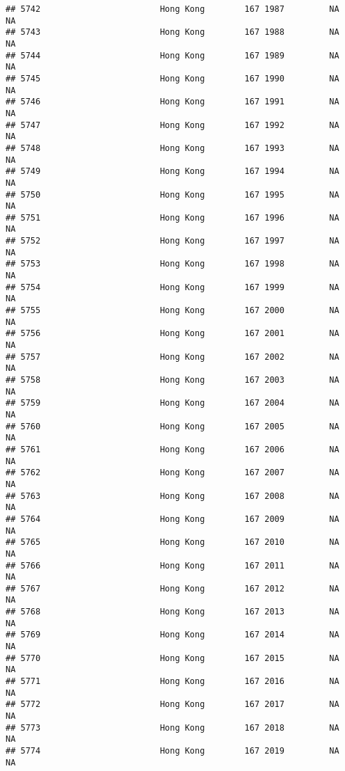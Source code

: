 \documentclass[
]{article}
\begin{document}
\begin{verbatim}
## 5742                        Hong Kong        167 1987         NA         NA
## 5743                        Hong Kong        167 1988         NA         NA
## 5744                        Hong Kong        167 1989         NA         NA
## 5745                        Hong Kong        167 1990         NA         NA
## 5746                        Hong Kong        167 1991         NA         NA
## 5747                        Hong Kong        167 1992         NA         NA
## 5748                        Hong Kong        167 1993         NA         NA
## 5749                        Hong Kong        167 1994         NA         NA
## 5750                        Hong Kong        167 1995         NA         NA
## 5751                        Hong Kong        167 1996         NA         NA
## 5752                        Hong Kong        167 1997         NA         NA
## 5753                        Hong Kong        167 1998         NA         NA
## 5754                        Hong Kong        167 1999         NA         NA
## 5755                        Hong Kong        167 2000         NA         NA
## 5756                        Hong Kong        167 2001         NA         NA
## 5757                        Hong Kong        167 2002         NA         NA
## 5758                        Hong Kong        167 2003         NA         NA
## 5759                        Hong Kong        167 2004         NA         NA
## 5760                        Hong Kong        167 2005         NA         NA
## 5761                        Hong Kong        167 2006         NA         NA
## 5762                        Hong Kong        167 2007         NA         NA
## 5763                        Hong Kong        167 2008         NA         NA
## 5764                        Hong Kong        167 2009         NA         NA
## 5765                        Hong Kong        167 2010         NA         NA
## 5766                        Hong Kong        167 2011         NA         NA
## 5767                        Hong Kong        167 2012         NA         NA
## 5768                        Hong Kong        167 2013         NA         NA
## 5769                        Hong Kong        167 2014         NA         NA
## 5770                        Hong Kong        167 2015         NA         NA
## 5771                        Hong Kong        167 2016         NA         NA
## 5772                        Hong Kong        167 2017         NA         NA
## 5773                        Hong Kong        167 2018         NA         NA
## 5774                        Hong Kong        167 2019         NA         NA

\end{verbatim}
\end{document}
